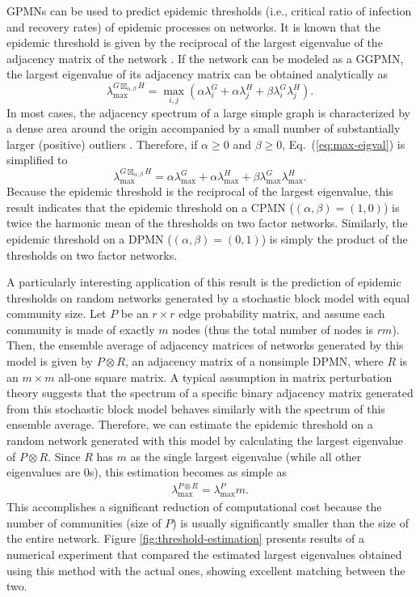 \documentclass{article}
\DeclareMathOperator*{\KP}{\otimes}
\DeclareMathOperator*{\GP}{\boxtimes}
\begin{document}
GPMNs can be used to predict epidemic thresholds (i.e., critical ratio
of infection and recovery rates) of epidemic processes on networks. It
is known that the epidemic threshold is given by the reciprocal of the
largest eigenvalue of the adjacency matrix of the network
\cite{chakrabarti2008epidemic}. If the network can be modeled as a
GGPMN, the largest eigenvalue of its adjacency matrix can be obtained
analytically as
\begin{equation}
\lambda_{\max}^{G \GP_{\alpha, \beta} H} = \max_{i,j} \left( \alpha \lambda^G_i + \alpha \lambda^H_j + \beta \lambda^G_i \lambda^H_j \right) . \label{eq:max-eigval}
\end{equation}
In most cases, the adjacency spectrum of a large simple graph is
characterized by a dense area around the origin accompanied by a small
number of substantially larger (positive) outliers
\cite{farkas2001spectra}. Therefore, if $\alpha \ge 0$ and $\beta \ge
0$, Eq.~(\ref{eq:max-eigval}) is simplified to
\begin{equation}
\lambda_{\max}^{G \GP_{\alpha, \beta} H} = \alpha \lambda^G_{\max} + \alpha \lambda^H_{\max} + \beta \lambda^G_{\max} \lambda^H_{\max} . \label{eq:lambdamax-formula}
\end{equation}
Because the epidemic threshold is the reciprocal of the largest
eigenvalue, this result indicates that the epidemic threshold on a
CPMN ($(\alpha, \beta) = (1, 0)$) is twice the harmonic mean of the
thresholds on two factor networks. Similarly, the epidemic threshold
on a DPMN ($(\alpha, \beta) = (0, 1)$) is simply the product of the
thresholds on two factor networks.

A particularly interesting application of this result is the
prediction of epidemic thresholds on random networks generated by a
stochastic block model with equal community size. Let $P$ be an $r
\times r$ edge probability matrix, and assume each community is made
of exactly $m$ nodes (thus the total number of nodes is $rm$). Then,
the ensemble average of adjacency matrices of networks generated by
this model is given by $P \KP R$, an adjacency matrix of a nonsimple
DPMN, where $R$ is an $m \times m$ all-one square matrix. A typical
assumption in matrix perturbation theory suggests that the spectrum of
a specific binary adjacency matrix generated from this stochastic
block model behaves similarly with the spectrum of this ensemble
average. Therefore, we can estimate the epidemic threshold on a random
network generated with this model by calculating the largest
eigenvalue of $P \KP R$. Since $R$ has $m$ as the single largest
eigenvalue (while all other eigenvalues are 0s), this estimation
becomes as simple as
\begin{align}
\lambda_{\max}^{P \KP R} = \lambda^P_{\max} m . \label{eq:threshold-estimation}
\end{align}
This accomplishes a significant reduction of computational cost
because the number of communities (size of $P$) is usually
significantly smaller than the size of the entire network. Figure
\ref{fig:threshold-estimation} presents results of a numerical
experiment that compared the estimated largest eigenvalues obtained
using this method with the actual ones, showing excellent matching
between the two.
\end{document}
